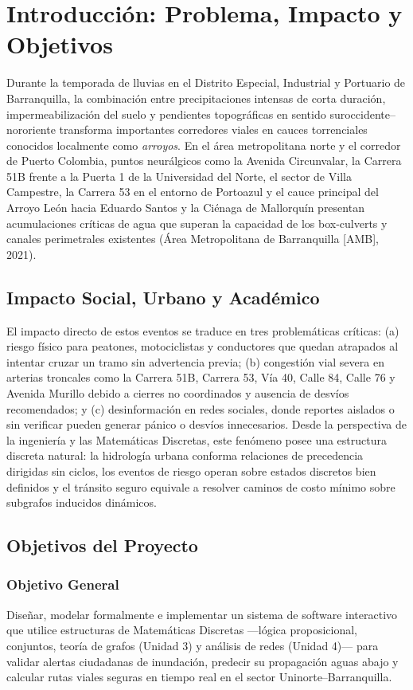\documentclass[12pt,letterpaper]{article}
\begin{document}
\section{Introducción: Problema, Impacto y Objetivos}

Durante la temporada de lluvias en el Distrito Especial, Industrial y Portuario de Barranquilla, la combinación entre precipitaciones intensas de corta duración, impermeabilización del suelo y pendientes topográficas en sentido suroccidente--nororiente transforma importantes corredores viales en cauces torrenciales conocidos localmente como \textit{arroyos}. En el área metropolitana norte y el corredor de Puerto Colombia, puntos neurálgicos como la Avenida Circunvalar, la Carrera 51B frente a la Puerta 1 de la Universidad del Norte, el sector de Villa Campestre, la Carrera 53 en el entorno de Portoazul y el cauce principal del Arroyo León hacia Eduardo Santos y la Ciénaga de Mallorquín presentan acumulaciones críticas de agua que superan la capacidad de los box-culverts y canales perimetrales existentes (Área Metropolitana de Barranquilla [AMB], 2021).

\subsection{Impacto Social, Urbano y Académico}

El impacto directo de estos eventos se traduce en tres problemáticas críticas: (a) riesgo físico para peatones, motociclistas y conductores que quedan atrapados al intentar cruzar un tramo sin advertencia previa; (b) congestión vial severa en arterias troncales como la Carrera 51B, Carrera 53, Vía 40, Calle 84, Calle 76 y Avenida Murillo debido a cierres no coordinados y ausencia de desvíos recomendados; y (c) desinformación en redes sociales, donde reportes aislados o sin verificar pueden generar pánico o desvíos innecesarios. Desde la perspectiva de la ingeniería y las Matemáticas Discretas, este fenómeno posee una estructura discreta natural: la hidrología urbana conforma relaciones de precedencia dirigidas sin ciclos, los eventos de riesgo operan sobre estados discretos bien definidos y el tránsito seguro equivale a resolver caminos de costo mínimo sobre subgrafos inducidos dinámicos.

\subsection{Objetivos del Proyecto}

\subsubsection{Objetivo General}
Diseñar, modelar formalmente e implementar un sistema de software interactivo que utilice estructuras de Matemáticas Discretas ---lógica proposicional, conjuntos, teoría de grafos (Unidad 3) y análisis de redes (Unidad 4)--- para validar alertas ciudadanas de inundación, predecir su propagación aguas abajo y calcular rutas viales seguras en tiempo real en el sector Uninorte--Barranquilla.
\end{document}
